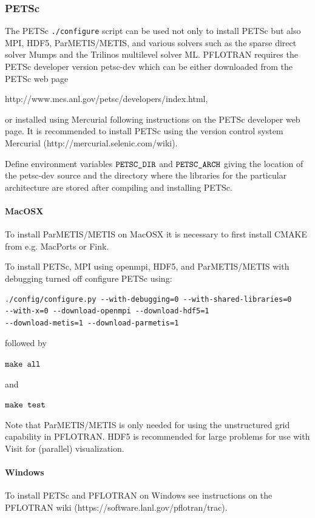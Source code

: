 \documentclass[12pt]{article}
\begin{document}
\subsubsection{PETSc}

The PETSc {\tt ./configure} script can be used not only to install PETSc but also MPI, HDF5, ParMETIS/METIS, and various solvers such as the sparse direct solver Mumps and the Trilinos multilevel solver ML. PFLOTRAN requires the PETSc developer version petsc-dev which can be either downloaded from the PETSc web page 

http://www.mcs.anl.gov/petsc/developers/index.html, 

\noindent
or installed using Mercurial following instructions on the PETSc developer web page. It is recommended to install PETSc using the version control system Mercurial (http://mercurial.selenic.com/wiki).

Define environment variables $\verb|PETSC_DIR|$ and $\verb|PETSC_ARCH|$ giving the location of the petsc-dev source and the directory where the libraries for the particular architecture are stored after compiling and installing PETSc.

\paragraph{MacOSX}
To install ParMETIS/METIS on MacOSX it is necessary to first install CMAKE from e.g. MacPorts or Fink.

To install PETSc, MPI using openmpi, HDF5, and ParMETIS/METIS with debugging turned off configure PETSc using:

\begin{verbatim}
./config/configure.py --with-debugging=0 --with-shared-libraries=0 
--with-x=0 --download-openmpi --download-hdf5=1 
--download-metis=1 --download-parmetis=1
\end{verbatim}

\noindent
followed by

$\verb|make all|$

\noindent
and

$\verb|make test|$

Note that ParMETIS/METIS is only needed for using the unstructured grid capability in PFLOTRAN. HDF5 is recommended for large problems for use with Visit for (parallel) visualization.

\paragraph{Windows}
To install PETSc and PFLOTRAN on Windows see instructions on the PFLOTRAN wiki (https://software.lanl.gov/pflotran/trac).
\end{document}
